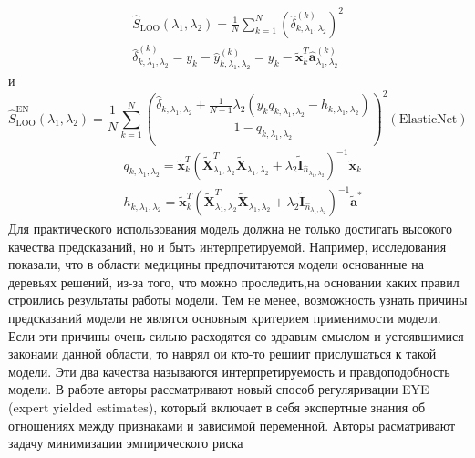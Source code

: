 \documentclass[12pt, twoside]{article}
\begin{document}
\begin{equation}
\begin{array}{c}
{\hat{S}_{\mathrm{LOO}}\left(\lambda_{1}, \lambda_{2}\right)=\frac{1}{N} \sum_{k=1}^{N}\left(\hat{\delta}_{k, \lambda_{1}, \lambda_{2}}^{(k)}\right)^{2}} \\
{\hat{\delta}_{k, \lambda_{1}, \lambda_{2}}^{(k)}=y_{k}-\hat{y}_{k, \lambda_{1}, \lambda_{2}}^{(k)}=y_{k}-\tilde{\mathbf{x}}_{k}^{T} \hat{\mathbf{a}}_{\lambda_{1}, \lambda_{2}}^{(k)}}
\end{array}
\end{equation}
и
\begin{equation}
\hat{S}_{\mathrm{LOO}}^{\mathrm{EN}}\left(\lambda_{1}, \lambda_{2}\right)=\frac{1}{N} \sum_{k=1}^{N}\left(\frac{\hat{\delta}_{k, \lambda_{1}, \lambda_{2}}+\frac{1}{N-1} \lambda_{2}\left(y_{k} q_{k, \lambda_{1}, \lambda_{2}}-h_{k, \lambda_{1}, \lambda_{2}}\right)}{1-q_{k, \lambda_{1}, \lambda_{2}}}\right)^{2}(\text {ElasticNet})
\end{equation}
\begin{equation}
\begin{aligned}
&q_{k, \lambda_{1}, \lambda_{2}}=\tilde{\mathbf{x}}_{k}^{T}\left(\tilde{\mathbf{X}}_{\lambda_{1}, \lambda_{2}}^{T} \tilde{\mathbf{X}}_{\lambda_{1}, \lambda_{2}}+\lambda_{2} \tilde{\mathbf{I}}_{\hat{n}_{\lambda_{1}, \lambda_{2}}}\right)^{-1} \tilde{\mathbf{x}}_{k}\\
&h_{k, \lambda_{1}, \lambda_{2}}=\tilde{\mathbf{x}}_{k}^{T}\left(\tilde{\mathbf{X}}_{\lambda_{1}, \lambda_{2}}^{T} \tilde{\mathbf{X}}_{\lambda_{1}, \lambda_{2}}+\lambda_{2} \tilde{\mathbf{I}}_{\hat{n}_{\lambda_{1}, \lambda_{2}}}\right)^{-1} \tilde{\mathbf{a}}^{*}
\end{aligned}
\end{equation}
Для практического использования модель должна не только достигать высокого качества предсказаний, но и быть интерпретируемой. Например, исследования показали, что в области медицины предпочитаются модели основанные на деревьях решений, из-за того, что можно проследить,на основании каких правил строились результаты работы модели. Тем не менее, возможность узнать причины предсказаний модели не являтся основным критерием применимости модели. Если эти причины очень сильно расходятся со здравым смыслом и устоявшимися законами данной области, то наврял ои кто-то решиит прислушаться к такой модели. Эти два качества называются интерпретируемость и правдоподобность модели. В работе \cite{bib_1} авторы рассматривают новый способ регуляризации EYE (expert yielded estimates), который включает в себя экспертные знания об отношениях между признаками и зависимой переменной. Авторы расматривают задачу минимизации эмпирического риска
\end{document}

